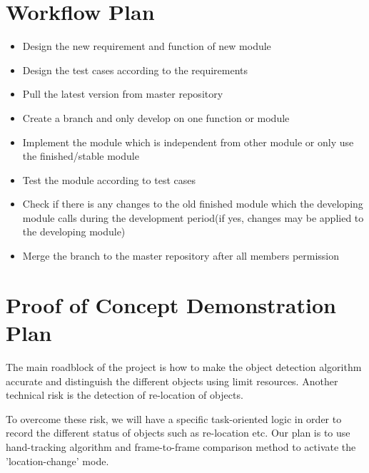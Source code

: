 \documentclass{article}
\begin{document}
\begin{large}
\begin{itemize}
\end{itemize}	
	









\section{Workflow Plan}

\begin{itemize}
	\item Design the new requirement and function of new module
	\item Design the test cases according to the requirements
	\item Pull the latest version from master repository
	\item Create a branch and only develop on one function or module
	\item Implement the module which is independent from other module or only use the finished/stable module
	\item Test the module according to test cases
	\item Check if there is any changes to the old finished module which the developing module calls during the development period(if yes, changes may be applied to the developing module)
	\item Merge the branch to the master repository after all members permission

\end{itemize}

\section{Proof of Concept Demonstration Plan}


\hspace{0.5cm}The main roadblock of the project is how to make the object detection algorithm accurate and distinguish the different objects using limit resources. Another technical risk is the detection of re-location of objects.

To overcome these risk, we will have a specific task-oriented logic in order to record the different status of objects such as re-location etc. Our plan is to use hand-tracking algorithm and frame-to-frame comparison method to activate the 'location-change' mode.



\end{large}
\end{document}
